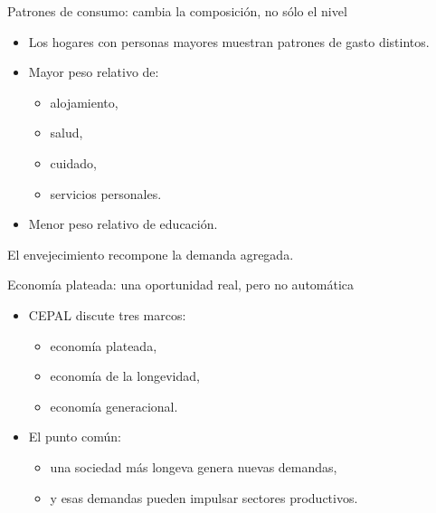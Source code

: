 \documentclass{beamer}
\begin{document}
\begin{frame}{Patrones de consumo: cambia la composición, no sólo el nivel}
\begin{itemize}
    \item Los hogares con personas mayores muestran patrones de gasto distintos.
    \item Mayor peso relativo de:
    \begin{itemize}
        \item alojamiento,
        \item salud,
        \item cuidado,
        \item servicios personales.
    \end{itemize}
    \item Menor peso relativo de educación.
\end{itemize}

\vspace{0.3cm}
El envejecimiento recompone la demanda agregada.
\end{frame}

\begin{frame}{Economía plateada: una oportunidad real, pero no automática}
\begin{itemize}
    \item CEPAL discute tres marcos:
    \begin{itemize}
        \item economía plateada,
        \item economía de la longevidad,
        \item economía generacional.
    \end{itemize}
    \item El punto común:
    \begin{itemize}
        \item una sociedad más longeva genera nuevas demandas,
        \item y esas demandas pueden impulsar sectores productivos.
    \end{itemize}
\end{itemize}
\end{frame}
\end{document}
